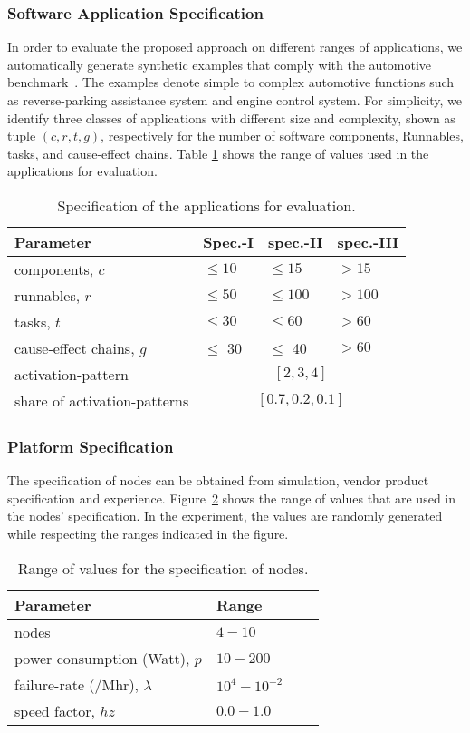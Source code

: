 \subsubsection{Software Application Specification} In order to evaluate the proposed approach on different ranges of applications, we automatically generate synthetic examples that comply with the automotive benchmark~\cite{Kramer2015RealFree}. The examples denote simple to complex automotive functions such as reverse-parking assistance system and engine control system. For simplicity, we identify three classes of applications with different size and complexity, shown as tuple $(c, r, t, g)$, respectively for the number of software components, Runnables, tasks, and cause-effect chains. Table \ref{tbl_appsspec} shows the range of values used in the applications for evaluation. 
\begin{table}[h]
\centering\small
\begin{tabular}{@{}llll@{}}
\toprule
Parameter  		& Spec.-I  & spec.-II & spec.-III\\ 
\midrule
components, $c$		& $\leq 10$	& $\leq 15$ 	& $> 15$\\ 
runnables, $r$		& $\leq 50$	& $\leq 100$ 	& $> 100$\\
tasks, $t$ 			& $\leq 30$ & $\leq 60$ 	& $> 60$\\
cause-effect chains, $g$ & $\leq$ 30 & $\leq$ 40 & $> 60$\\ \midrule
activation-pattern	& \multicolumn{3}{c}{$[2,3,4]$}\\ \midrule
share of activation-patterns	& \multicolumn{3}{c}{$[0.7, 0.2, 0.1]$}\\
\bottomrule
\end{tabular}
\caption{Specification of the applications for evaluation.}
\label{tbl_appsspec}
\end{table}

\subsubsection{Platform Specification} The specification of nodes can be obtained from simulation, vendor product specification and  experience. Figure~\ref{tbl_nodesspecs} shows the range of values that are used in the nodes' specification. In the experiment, the values are randomly generated while respecting the ranges indicated in the figure.
\begin{table}[h]
\centering\small
\begin{tabular}{@{}llll@{}}
\toprule
Parameter  		& Range\\ 
\midrule
nodes							& $4-10$\\
power consumption (Watt), $p$ 	& $10 - 200$\\
failure-rate (/Mhr), $\lambda$ 	& $10^4 - 10^{-2}$\\
speed factor, $hz$			 	& $0.0 - 1.0$\\
\bottomrule
\end{tabular}
\caption{Range of values for the specification of nodes.}
\label{tbl_nodesspecs}
\end{table}

